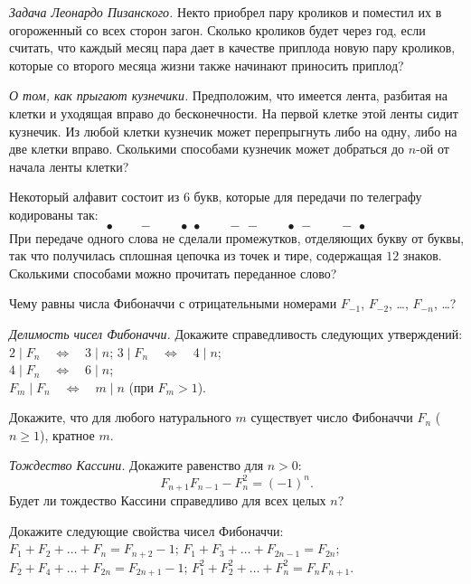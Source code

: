 \begin{problems}

\item\emph{Задача Леонардо Пизанского.}
Некто приобрел пару кроликов и поместил их в огороженный со всех сторон загон.
Сколько кроликов будет через год, если считать, что каждый месяц пара дает в
качестве приплода новую пару кроликов, которые со второго месяца жизни также
начинают приносить приплод?

\item\label{kuz}\emph{О том, как прыгают кузнечики.}
Предположим, что имеется лента, разбитая на клетки и уходящая вправо до
бесконечности.
На первой клетке этой ленты сидит кузнечик.
Из любой клетки кузнечик может перепрыгнуть либо на одну, либо на две клетки
вправо.
Сколькими способами кузнечик может добраться до $n$-ой от начала ленты клетки?

\item
Некоторый алфавит состоит из $6$ букв,
которые для передачи по телеграфу кодированы так:
\[
    \bullet
\qquad
    -
\qquad
    {\bullet}\,{\bullet}
\qquad
    {-}\,{-}
\qquad
    {\bullet}\,{-}
\qquad
    {-}\,{\bullet}
\]
При передаче одного слова не сделали промежутков, отделяющих букву от буквы,
так что получилась сплошная цепочка из точек и тире, содержащая $12$ знаков.
Сколькими способами можно прочитать переданное слово?

\item
Чему равны числа Фибоначчи с отрицательными номерами
$F_{-1}$, $F_{-2}$, \ldots, $F_{-n}$, \ldots?

\item\emph{Делимость чисел Фибоначчи.}
Докажите справедливость следующих утверждений:
\\
\sbp $2 \mid F_n \quad\Leftrightarrow\quad 3 \mid n$;
\qquad
\sbp $3 \mid F_n \quad\Leftrightarrow\quad 4 \mid n$;
\\
\sbp $4 \mid F_n \quad\Leftrightarrow\quad 6 \mid n$;
\\
\sbp $F_m \mid F_n \quad\Leftrightarrow\quad m \mid n$ (при $F_m > 1$).

\item
Докажите, что для любого натурального $m$ существует число Фибоначчи
$F_n$ ($n \geq 1$), кратное $m$.

\item\emph{Тождество Кассини.}
Докажите равенство для $n > 0$:
\[
    F_{n+1} F_{n-1} - F_n^2
=
    (-1)^n
.\]
Будет ли тождество Кассини справедливо для всех целых $n$?

\item
Докажите следующие свойства чисел Фибоначчи:
\\
\sbp $F_1 + F_2 + \ldots + F_n = F_{n+2} - 1$;
\qquad
\sbp $F_1 + F_3 + \ldots + F_{2n-1} = F_{2n}$;
\\
\sbp $F_2 + F_4 + \ldots + F_{2n} = F_{2n+1} - 1$;
\qquad
\sbp $F_1^2 + F_2^2 + \ldots + F_n^2 = F_n F_{n+1}$.


\end{problems}
